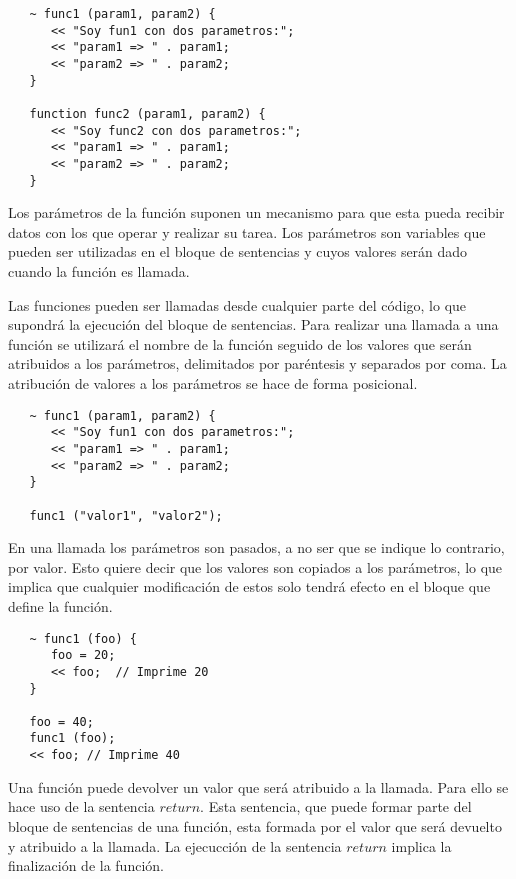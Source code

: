 \begin{lstlisting}
   ~ func1 (param1, param2) { 
      << "Soy fun1 con dos parametros:";
      << "param1 => " . param1;
      << "param2 => " . param2;
   }
   
   function func2 (param1, param2) { 
      << "Soy func2 con dos parametros:";
      << "param1 => " . param1;
      << "param2 => " . param2;
   }
\end{lstlisting}

Los parámetros de la función suponen un mecanismo para que esta pueda recibir datos con los que operar
y realizar su tarea. Los parámetros son variables que pueden ser utilizadas en el bloque de sentencias
y cuyos valores serán dado cuando la función es llamada.

Las funciones pueden ser llamadas desde cualquier parte del código, lo que supondrá la ejecución del bloque
de sentencias. Para realizar una llamada a una función se utilizará el nombre de la función seguido de los 
valores que serán atribuidos a los parámetros, delimitados por paréntesis y separados por coma. La atribución
de valores a los parámetros se hace de forma posicional. \\

\begin{lstlisting}
   ~ func1 (param1, param2) { 
      << "Soy fun1 con dos parametros:";
      << "param1 => " . param1;
      << "param2 => " . param2;
   }
   
   func1 ("valor1", "valor2");
\end{lstlisting}

En una llamada los parámetros son pasados, a no ser que se indique lo contrario, por valor. Esto quiere decir 
que los valores son copiados a los parámetros, lo que implica que cualquier modificación de estos solo tendrá efecto en el bloque 
que define la función. \\


\begin{lstlisting}
   ~ func1 (foo) { 
      foo = 20;
      << foo;  // Imprime 20
   }
   
   foo = 40;
   func1 (foo);
   << foo; // Imprime 40
\end{lstlisting}


Una función puede devolver un valor que será atribuido a la llamada. Para ello 
se hace uso de la sentencia $return$. Esta sentencia, que puede formar parte del
bloque de sentencias de una función, esta formada por el valor que será devuelto 
y atribuido a la llamada. La ejecucción de la sentencia $return$ implica 
la finalización de la función.

